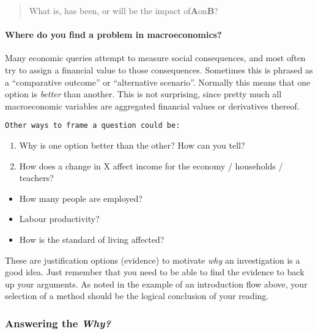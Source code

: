 \documentclass[10pt,twoside]{article}
\let\oldparagraph\paragraph
\renewcommand{\paragraph}[1]{\oldparagraph{#1}\mbox{}}
\begin{document}
\begin{quote}
What is, has been, or will be the impact of\textbf{A}on\textbf{B}?
\end{quote}

\hypertarget{where-do-you-find-a-problem-in-macroeconomics}{%
\paragraph{\texorpdfstring{\textbf{Where do you find a problem in
macroeconomics?}}{Where do you find a problem in macroeconomics?}}\label{where-do-you-find-a-problem-in-macroeconomics}}

Many economic queries attempt to measure social consequences, and most
often try to assign a financial value to those consequences. Sometimes
this is phrased as a ``comparative outcome'' or ``alternative
scenario''. Normally this means that one option is \emph{better} than
another. This is not surprising, since pretty much all macroeconomic
variables are aggregated financial values or derivatives thereof.

\begin{verbatim}
Other ways to frame a question could be:
\end{verbatim}

\begin{enumerate}
\def\labelenumi{\arabic{enumi}.}
\item
  Why is one option better than the other? How can you tell?
\item
  How does a change in X affect income for the economy / households /
  teachers?
\end{enumerate}

\begin{itemize}
\item
  How many people are employed?
\item
  Labour productivity?
\item
  How is the standard of living affected?
\end{itemize}

These are justification options (evidence) to motivate \emph{why} an
investigation is a good idea. Just remember that you need to be able to
find the evidence to back up your arguments. As noted in the example of
an introduction flow above, your selection of a method should be the
logical conclusion of your reading.

\hypertarget{answering-the-why}{%
\subsubsection{\texorpdfstring{Answering the
\emph{Why?}}{Answering the Why?}}\label{answering-the-why}}
\end{document}
